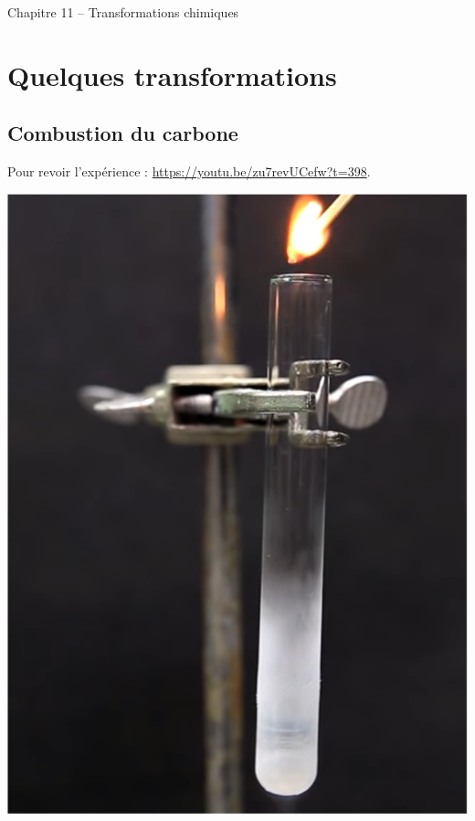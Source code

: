 \documentclass[12pt,a4paper,fleqn]{article}
\begin{document}
\normalem

\begin{header}
Chapitre 11 -- Transformations chimiques
\end{header}

\section{Quelques transformations}

\subsection{Combustion du carbone}

Pour revoir l'expérience : \href{https://youtu.be/zu7revUCefw?t=398}{https://youtu.be/zu7revUCefw?t=398}.

\begin{multicols}{2}

\begin{center}
\includegraphics[width=\linewidth/2]{images/c_in_o2.png}
\end{center}


\end{multicols}
\end{document}
